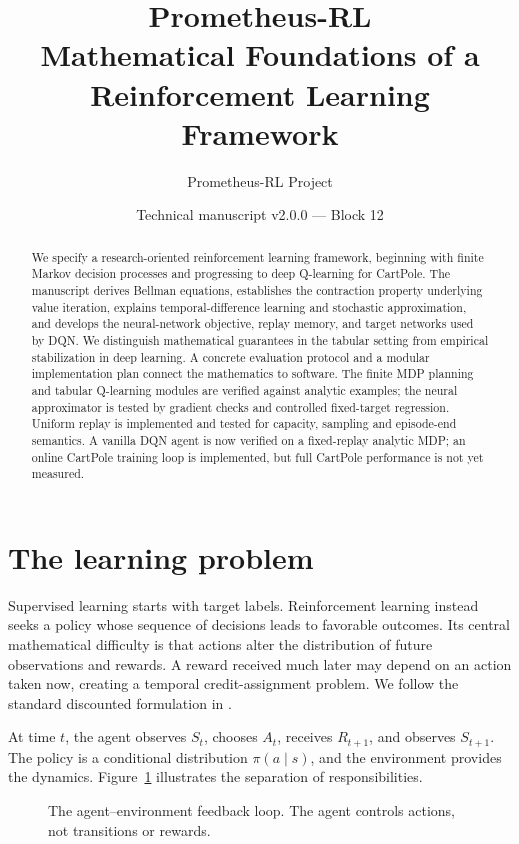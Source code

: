 \documentclass[11pt,a4paper]{article}
\title{\textbf{Prometheus-RL}\\[4pt]\large Mathematical Foundations of a Reinforcement Learning Framework}
\author{Prometheus-RL Project}
\date{Technical manuscript v2.0.0 --- Block 12}
\begin{document}
\maketitle
\begin{abstract}
We specify a research-oriented reinforcement learning framework, beginning with finite Markov decision processes and progressing to deep Q-learning for CartPole. The manuscript derives Bellman equations, establishes the contraction property underlying value iteration, explains temporal-difference learning and stochastic approximation, and develops the neural-network objective, replay memory, and target networks used by DQN. We distinguish mathematical guarantees in the tabular setting from empirical stabilization in deep learning. A concrete evaluation protocol and a modular implementation plan connect the mathematics to software. The finite MDP planning and tabular Q-learning modules are verified against analytic examples; the neural approximator is tested by gradient checks and controlled fixed-target regression. Uniform replay is implemented and tested for capacity, sampling and episode-end semantics. A vanilla DQN agent is now verified on a fixed-replay analytic MDP; an online CartPole training loop is implemented, but full CartPole performance is not yet measured.
\end{abstract}
\tableofcontents
\newpage
\section{The learning problem}
Supervised learning starts with target labels. Reinforcement learning instead seeks a policy whose sequence of decisions leads to favorable outcomes. Its central mathematical difficulty is that actions alter the distribution of future observations and rewards. A reward received much later may depend on an action taken now, creating a temporal credit-assignment problem. We follow the standard discounted formulation in \cite{sutton}.

At time $t$, the agent observes $S_t$, chooses $A_t$, receives $R_{t+1}$, and observes $S_{t+1}$. The policy is a conditional distribution $\pi(a\mid s)$, and the environment provides the dynamics. Figure~\ref{fig:loop} illustrates the separation of responsibilities.
\begin{figure}[ht]
\centering
{}
\caption{The agent--environment feedback loop. The agent controls actions, not transitions or rewards.}\label{fig:loop}
\end{figure}
\end{document}
